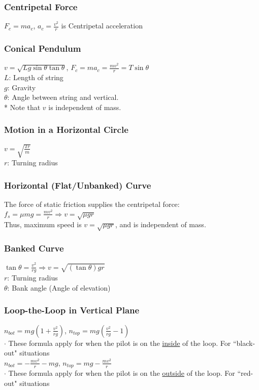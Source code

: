 \documentclass[10 pt]{article}
\begin{document}
\begin{multicols}{2}
\subsubsection*{Centripetal Force}
$F_c = ma_c$, $a_c = \frac{v^2}{r}$ is Centripetal acceleration
\subsubsection*{Conical Pendulum}
$v = \sqrt{Lg \sin \theta \tan \theta}$, $F_c = ma_c = \frac{mv^2}{r} = T \sin \theta$\\
$L$: Length of string\\
$g$: Gravity\\
$\theta$: Angle between string and vertical.\\
* Note that $v$ is independent of mass.
\subsubsection*{Motion in a Horizontal Circle}
$v = \sqrt{\frac{Tr}{m}}$\\
$r$: Turning radius
\subsubsection*{Horizontal (Flat/Unbanked) Curve}
\noindent The force of static friction supplies the centripetal force:\\
\indent $f_s = \mu mg = \frac{mv^2}{r} \Rightarrow v = \sqrt{\mu g r}$\\
Thus, maximum speed is $v = \sqrt{\mu g r}$, and is independent of mass.
\subsubsection*{Banked Curve}
$\tan \theta = \frac{v^2}{rg} \Rightarrow v = \sqrt{(\tan{\theta})gr}$\\
$r$: Turning radius\\
$\theta$: Bank angle (Angle of elevation)
\subsubsection*{Loop-the-Loop in Vertical Plane}
$\displaystyle n_{bot} = mg (1 + \frac{v^2}{rg})$, $\displaystyle n_{top} = mg (\frac{v^2}{rg} - 1)$\\
$\cdot$ These formula apply for when the pilot is on the \underline{inside} of the loop. For ``black-out" situations\\
\indent $\displaystyle n_{bot} = - \frac{mv^2}{r} - mg$, $\displaystyle n_{top} = mg - \frac{mv^2}{r}$\\
$\cdot$ These formula apply for when the pilot is on the \underline{outside} of the loop. For ``red-out" situations

\end{multicols}
\end{document}
